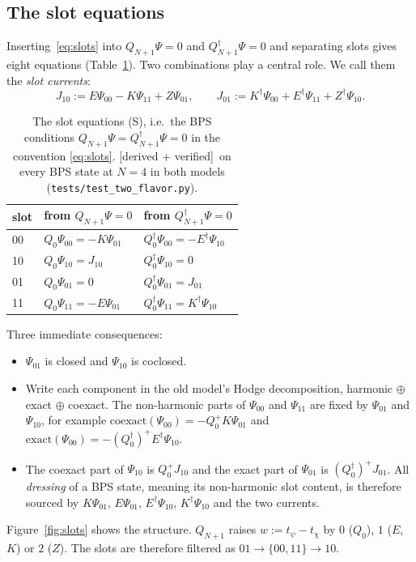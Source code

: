 \documentclass[11pt]{article}
\newcommand{\tagbox}[2]{\textsf{\small\color{#1}[#2]}}
\newcommand{\VER}{\tagbox{cder}{derived + verified}}
\theoremstyle{plain}
\theoremstyle{remark}
\numberwithin{equation}{section}
\begin{document}
\subsection{The slot equations}

Inserting~\eqref{eq:slots} into $Q_{N+1}\Psi=0$ and $Q_{N+1}^\dagger\Psi=0$ and separating slots gives eight equations
(Table~\ref{tab:slots}). Two combinations play a central role. We call them the \emph{slot currents}:
\begin{equation}\label{eq:currents}
J_{10}:=E\Psi_{00}-K\Psi_{11}+Z\Psi_{01},\qquad J_{01}:=K^\dagger\Psi_{00}+E^\dagger\Psi_{11}+Z^\dagger\Psi_{10}.
\end{equation}

\begin{table}[ht]
\centering\small
\caption{The slot equations (S), i.e.\ the BPS conditions $Q_{N+1}\Psi=Q_{N+1}^\dagger\Psi=0$ in the convention
\eqref{eq:slots}. \VER\ on every BPS state at $N=4$ in both models (\texttt{tests/test\_two\_flavor.py}).}\label{tab:slots}
\begin{tabular}{@{}lll@{}}\toprule
slot & from $Q_{N+1}\Psi=0$ & from $Q_{N+1}^\dagger\Psi=0$\\\midrule
00 & $Q_0\Psi_{00}=-K\Psi_{01}$ & $Q_0^\dagger\Psi_{00}=-E^\dagger\Psi_{10}$\\
10 & $Q_0\Psi_{10}=J_{10}$ & $Q_0^\dagger\Psi_{10}=0$\\
01 & $Q_0\Psi_{01}=0$ & $Q_0^\dagger\Psi_{01}=J_{01}$\\
11 & $Q_0\Psi_{11}=-E\Psi_{01}$ & $Q_0^\dagger\Psi_{11}=K^\dagger\Psi_{10}$\\\bottomrule
\end{tabular}
\end{table}

Three immediate consequences:
\begin{itemize}\itemsep2pt
\item $\Psi_{01}$ is closed and $\Psi_{10}$ is coclosed.
\item Write each component in the old model's Hodge decomposition, harmonic $\oplus$ exact $\oplus$ coexact. The
  non-harmonic parts of $\Psi_{00}$ and $\Psi_{11}$ are fixed by $\Psi_{01}$ and $\Psi_{10}$, for example
  $\mathrm{coexact}(\Psi_{00})=-Q_0^+K\Psi_{01}$ and $\mathrm{exact}(\Psi_{00})=-(Q_0^\dagger)^+E^\dagger\Psi_{10}$.
\item The coexact part of $\Psi_{10}$ is $Q_0^+J_{10}$ and the exact part of $\Psi_{01}$ is $(Q_0^\dagger)^+J_{01}$. All
  \emph{dressing} of a BPS state, meaning its non-harmonic slot content, is therefore sourced by $K\Psi_{01}$,
  $E\Psi_{01}$, $E^\dagger\Psi_{10}$, $K^\dagger\Psi_{10}$ and the two currents.
\end{itemize}
Figure~\ref{fig:slots} shows the structure. $Q_{N+1}$ raises $w:=t_\psi-t_\chi$ by $0$ ($Q_0$), $1$ ($E$, $K$) or $2$ ($Z$).
The slots are therefore filtered as $01\to\{00,11\}\to10$.
\end{document}
